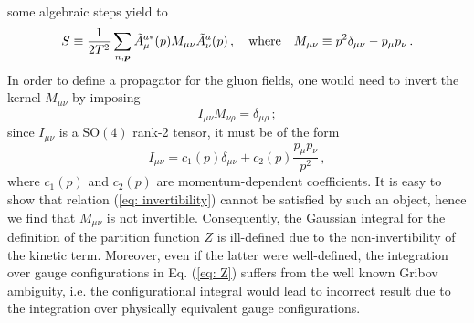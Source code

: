 \documentclass{article}
\begin{document}
some algebraic steps yield to
\begin{equation}
    S \equiv \frac{1}{2T^2} \sum_{n, \vb*{p}} \tilde{A}_\mu^{a *} (p) M_{\mu\nu} \tilde{A}_\nu^{a}(p) \, , \quad \text{where} \quad M_{\mu \nu} \equiv p^2 \delta_{\mu \nu} - p_\mu p_\nu \, .
\end{equation}
In order to define a propagator for the gluon fields, one would need to invert the kernel $M_{\mu\nu}$ by imposing
\begin{equation}\label{eq: invertibility}
    I_{\mu\nu} M_{\nu\rho} = \delta_{\mu \rho} \, ;
\end{equation}
since $I_{\mu\nu}$ is a $\mathrm{SO}(4)$ rank-2 tensor, it must be of the form
\begin{equation}
    I_{\mu\nu} = c_1(p) \delta_{\mu\nu} + c_2(p) \frac{p_\mu p_\nu}{p^2} \, ,  
\end{equation}
where $c_1(p)$ and $c_2(p)$ are momentum-dependent coefficients. It is easy to show that relation (\ref{eq: invertibility}) cannot be satisfied by such an object, hence we find that $M_{\mu\nu}$ is not invertible.
Consequently, the Gaussian integral for the definition of the partition function $Z$ is ill-defined due to the non-invertibility of the kinetic term.
Moreover, even if the latter were well-defined, the integration over gauge configurations in Eq. (\ref{eq: Z}) suffers from the well known Gribov ambiguity, i.e. the configurational integral would lead to incorrect result due to the 
integration over physically equivalent gauge configurations.
\end{document}
